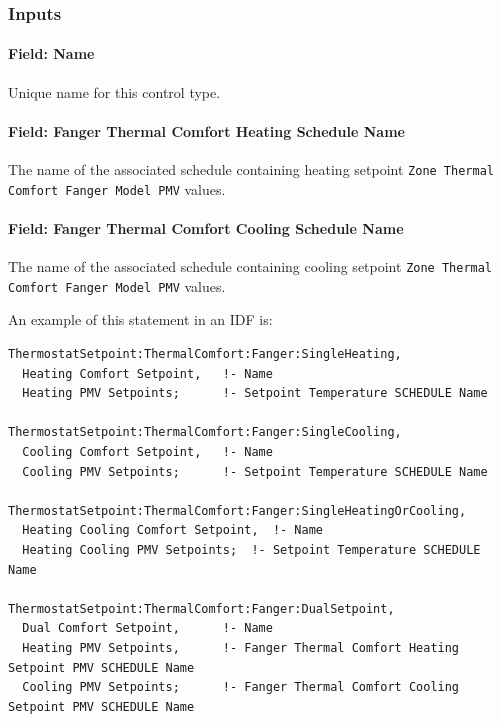 \subsubsection{Inputs}\label{inputs-13-017}

\paragraph{Field: Name}\label{field-name-11-016}

Unique name for this control type.

\paragraph{Field: Fanger Thermal Comfort Heating Schedule Name}\label{field-fanger-thermal-comfort-heating-schedule-name}

The name of the associated schedule containing heating setpoint \lstinline!Zone Thermal Comfort Fanger Model PMV! values.

\paragraph{Field: Fanger Thermal Comfort Cooling Schedule Name}\label{field-fanger-thermal-comfort-cooling-schedule-name}

The name of the associated schedule containing cooling setpoint \lstinline!Zone Thermal Comfort Fanger Model PMV! values.

An example of this statement in an IDF is:

\begin{lstlisting}
ThermostatSetpoint:ThermalComfort:Fanger:SingleHeating,
  Heating Comfort Setpoint,   !- Name
  Heating PMV Setpoints;      !- Setpoint Temperature SCHEDULE Name

ThermostatSetpoint:ThermalComfort:Fanger:SingleCooling,
  Cooling Comfort Setpoint,   !- Name
  Cooling PMV Setpoints;      !- Setpoint Temperature SCHEDULE Name

ThermostatSetpoint:ThermalComfort:Fanger:SingleHeatingOrCooling,
  Heating Cooling Comfort Setpoint,  !- Name
  Heating Cooling PMV Setpoints;  !- Setpoint Temperature SCHEDULE Name

ThermostatSetpoint:ThermalComfort:Fanger:DualSetpoint,
  Dual Comfort Setpoint,      !- Name
  Heating PMV Setpoints,      !- Fanger Thermal Comfort Heating Setpoint PMV SCHEDULE Name
  Cooling PMV Setpoints;      !- Fanger Thermal Comfort Cooling Setpoint PMV SCHEDULE Name
\end{lstlisting}


